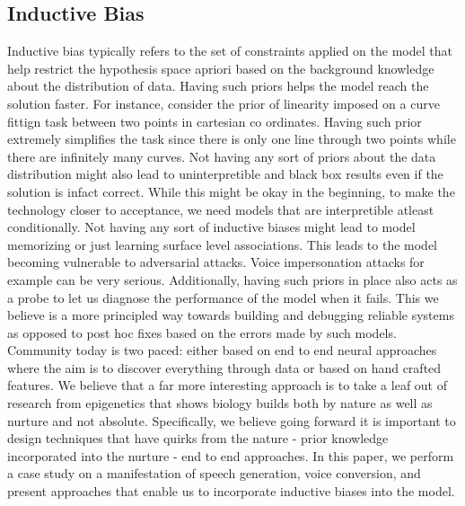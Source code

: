 \subsection{Inductive Bias}
Inductive bias typically refers to the set of constraints applied on the model that help restrict the hypothesis space apriori based on the background knowledge about the distribution of data. Having such priors helps the model reach the solution faster. For instance, consider the prior of linearity imposed on a curve fittign task between two points in cartesian co ordinates. Having such prior extremely simplifies the task since there is only one line through two points while there are infinitely many curves. Not having any sort of priors about the data distribution might also lead to uninterpretible and black box results even if the solution is infact correct. While this might be okay in the beginning, to make the technology closer to acceptance, we need models that are interpretible atleast conditionally. Not having any sort of inductive biases might lead to model memorizing or just learning surface level associations. This leads to the model becoming vulnerable to adversarial attacks. Voice impersonation attacks for example can be very serious. Additionally, having such priors in place also acts as a probe to let us diagnose the performance of the model when it fails. This we believe is a more principled way towards building and debugging reliable systems as opposed to post hoc fixes based on the errors made by such models. Community today is two paced: either based on end to end neural approaches where the aim is to discover everything through data or based on hand crafted features. We believe that a far more interesting approach is to take a leaf out of research from epigenetics that shows biology builds both by nature as well as nurture and not absolute. Specifically, we believe going forward it is important to design techniques that have quirks from the nature - prior knowledge incorporated into the nurture - end to end approaches. In this paper, we perform a case study on a manifestation of speech generation, voice conversion, and present approaches that enable us to incorporate inductive biases into the model.
\fi


